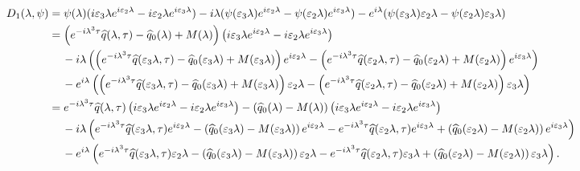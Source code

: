 \begin{align*}
    D_1(\lambda,\psi) &= \psi(\lambda)(i\varepsilon_3\lambda e^{i\varepsilon_2\lambda} - i\varepsilon_2\lambda e^{i\varepsilon_3\lambda}) - i\lambda(\psi(\varepsilon_3\lambda)e^{i\varepsilon_2\lambda} -\psi(\varepsilon_2\lambda)e^{i\varepsilon_3\lambda}) - e^{i\lambda}(\psi(\varepsilon_3\lambda)\varepsilon_2\lambda -\psi(\varepsilon_2\lambda)\varepsilon_3\lambda) \\
    &= \left(e^{-i \lambda^3 \tau}\widehat{q}(\lambda,\tau) - \widehat{q}_0(\lambda) + M(\lambda)\right)\left(i\varepsilon_3\lambda e^{i\varepsilon_2\lambda} - i\varepsilon_2\lambda e^{i\varepsilon_3\lambda}\right) \\
    &\hspace{1pc}- i\lambda\left(\left(e^{-i \lambda^3 \tau}\widehat{q}(\varepsilon_3\lambda,\tau) - \widehat{q}_0(\varepsilon_3\lambda) + M(\varepsilon_3\lambda)\right)e^{i\varepsilon_2\lambda} -\left(e^{-i \lambda^3 \tau}\widehat{q}(\varepsilon_2\lambda,\tau) - \widehat{q}_0(\varepsilon_2\lambda) + M(\varepsilon_2\lambda)\right)e^{i\varepsilon_3\lambda}\right)\\ 
    &\hspace{1pc}- e^{i\lambda}\left(\left(e^{-i \lambda^3 \tau}\widehat{q}(\varepsilon_3\lambda,\tau) - \widehat{q}_0(\varepsilon_3\lambda) + M(\varepsilon_3\lambda)\right)\varepsilon_2\lambda -\left(e^{-i \lambda^3 \tau}\widehat{q}(\varepsilon_2\lambda,\tau) - \widehat{q}_0(\varepsilon_2\lambda) + M(\varepsilon_2\lambda)\right)\varepsilon_3\lambda\right) \\
    &= e^{-i \lambda^3 \tau}\widehat{q}(\lambda,\tau)\left(i\varepsilon_3\lambda e^{i\varepsilon_2\lambda} - i\varepsilon_2\lambda e^{i\varepsilon_3\lambda}\right)- \left(\widehat{q}_0(\lambda) - M(\lambda)\right)\left(i\varepsilon_3\lambda e^{i\varepsilon_2\lambda} - i\varepsilon_2\lambda e^{i\varepsilon_3\lambda}\right)\\
    &\hspace{1pc}- i\lambda\left(e^{-i \lambda^3 \tau}\widehat{q}(\varepsilon_3\lambda,\tau)e^{i\varepsilon_2\lambda} -\left(\widehat{q}_0(\varepsilon_3\lambda) - M(\varepsilon_3\lambda)\right)e^{i\varepsilon_2\lambda} - e^{-i \lambda^3 \tau}\widehat{q}(\varepsilon_2\lambda,\tau)e^{i\varepsilon_3\lambda} + \left(\widehat{q}_0(\varepsilon_2\lambda) - M(\varepsilon_2\lambda)\right)e^{i\varepsilon_3\lambda}\right)\\ 
    &\hspace{1pc}- e^{i\lambda}\left(e^{-i \lambda^3 \tau}\widehat{q}(\varepsilon_3\lambda,\tau)\varepsilon_2\lambda -\left(\widehat{q}_0(\varepsilon_3\lambda) - M(\varepsilon_3\lambda)\right)\varepsilon_2\lambda - e^{-i \lambda^3 \tau}\widehat{q}(\varepsilon_2\lambda,\tau)\varepsilon_3\lambda + \left(\widehat{q}_0(\varepsilon_2\lambda) - M(\varepsilon_2\lambda)\right)\varepsilon_3\lambda\right).
\end{align*}
